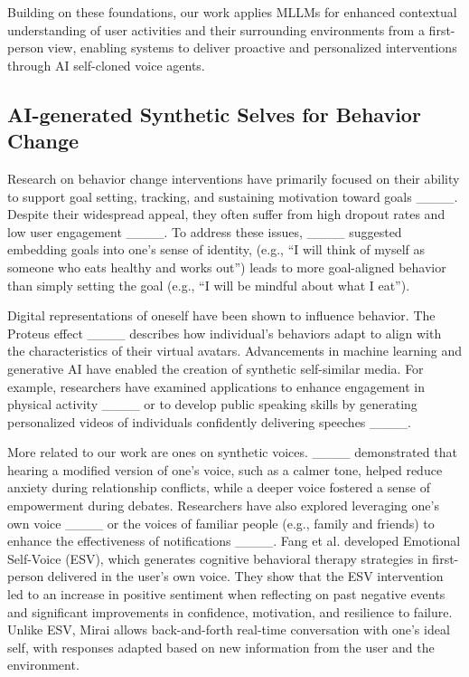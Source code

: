 Building on these foundations, our work applies MLLMs for enhanced contextual understanding of user activities and their surrounding environments from a first-person view, enabling systems to deliver proactive and personalized interventions through AI self-cloned voice agents.

\subsection{AI-generated Synthetic Selves for Behavior Change}
Research on behavior change interventions have primarily focused on their ability to support goal setting, tracking, and sustaining motivation toward goals ____. Despite their widespread appeal, they often suffer from high dropout rates and low user engagement ____. To address these issues, ____ suggested embedding goals into one’s sense of identity, (e.g., ``I will think of myself as someone who eats healthy and works out'') leads to more goal-aligned behavior than simply setting the goal (e.g., ``I will be mindful about what I eat''). 


Digital representations of oneself have been shown to influence behavior. The Proteus effect ____ describes how individual's behaviors adapt to align with the characteristics of their virtual avatars. Advancements in machine learning and generative AI have enabled the creation of synthetic self-similar media. For example, researchers have examined applications to enhance engagement in physical activity ____ or to develop public speaking skills by generating personalized videos of individuals confidently delivering speeches ____. 

More related to our work are ones on synthetic voices. ____ demonstrated that hearing a modified version of one’s voice, such as a calmer tone, helped reduce anxiety during relationship conflicts, while a deeper voice fostered a sense of empowerment during debates. Researchers have also explored leveraging one’s own voice ____ or the voices of familiar people (e.g., family and friends) to enhance the effectiveness of notifications ____.  Fang et al. developed Emotional Self-Voice (ESV), which generates cognitive behavioral therapy strategies in first-person delivered in the user's own voice. They show that the ESV intervention led to an increase in positive sentiment when reflecting on past negative events and significant improvements in confidence, motivation, and resilience to failure. Unlike ESV, Mirai allows back-and-forth real-time conversation with one's ideal self, with responses adapted based on new information from the user and the environment.
